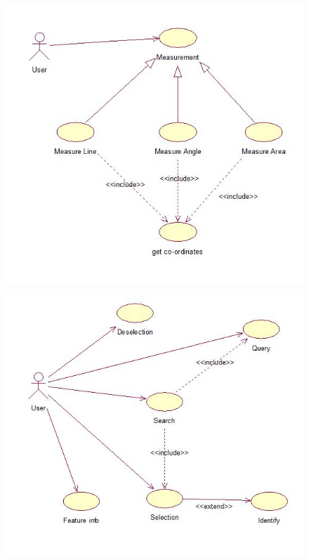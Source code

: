\begin{figure}[h]
\begin{center}
  \includegraphics {Measure.jpg}
\end{center}
\end{figure}
\begin{figure}[h]
\begin{center}
  \includegraphics {Selection.jpg}
\end{center}
\end{figure}
